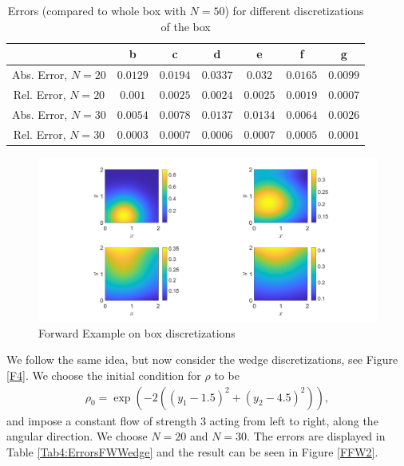 \documentclass[11pt, a4paper]{article}
\theoremstyle{definition}
\begin{document}
\begin{table}
	\caption{Errors (compared to whole box with $N = 50$) for different discretizations of the box}
	\begin{tabular}{ ||c| c| c| c| c| c| c|| }
		\hline
		\hline
		& b & c & d & e & f & g\\ 
		\hline
		Abs. Error, $N =20$& $0.0129$ & $0.0194$ & $0.0337$& $0.032$&  $ 0.0165$ & $0.0099$ \\  
		Rel. Error, $N =20$& $0.001$& $0.0025$ & $0.0024$ & $0.0025$& $0.0019$  & $0.0007$ \\
		Abs. Error, $N =30$& $0.0054$ & $0.0078$ & $0.0137$ &$0.0134$&$0.0064$& $0.0026$\\  
		Rel. Error, $N =30$ & $0.0003$& $0.0007$ &$0.0006$ &$0.0007$&$0.0005$& $0.0001$\\
		\hline
		\hline
	\end{tabular}
	\label{Tab3:ErrorsFWBox}
\end{table}
\begin{figure}[h]
	\centering
	\includegraphics[scale=0.35]{FWBox.png}
	\caption{Forward Example on box discretizations} 
	\label{FFW1}
\end{figure}


We follow the same idea, but now consider the wedge discretizations, see Figure \ref{F4}. We choose the initial condition for $\rho$ to be
\begin{align*}
	\rho_0 = \exp(-2((y_1 - 1.5 )^2 + (y_2 - 4.5)^2)),
\end{align*}
and impose a constant flow of strength $3$ acting from left to right, along the angular direction.
We choose $N = 20$ and $N = 30$. The errors are displayed in Table \ref{Tab4:ErrorsFWWedge} and the result can be seen in Figure \ref{FFW2}. 
\end{document}
